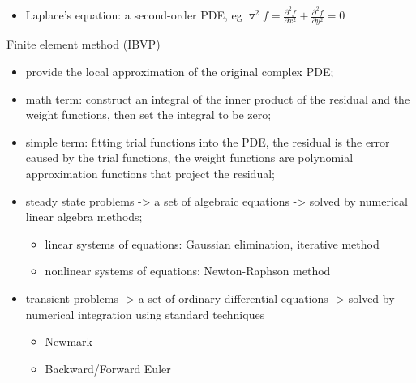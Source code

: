 \documentclass[12pt]{report}
\renewcommand{\_}{\kern-1.5pt\textunderscore\kern-1.5pt}
\begin{document}
\begin{itemize}
\begin{itemize}
	\item Laplace’s equation: a second-order PDE, eg  \( \triangledown ^{2}f=\frac{ \partial ^{2}f}{ \partial x^{2}}+\frac{ \partial ^{2}f}{ \partial y^{2}}=0 \) 
\end{itemize}\par

Finite element method (IBVP)\par

\begin{itemize}
	\item provide the local approximation of the original complex PDE;\par

	\item math term: construct an integral of the inner product of the residual and the weight functions, then set the integral to be zero;\par

	\item simple term: fitting trial functions into the PDE, the residual is the error caused by the trial functions, the weight functions are polynomial approximation functions that project the residual;\par

	\item steady state problems -> a set of algebraic equations -> solved by numerical linear algebra methods;\par

\begin{itemize}
	\item linear systems of equations: Gaussian elimination, iterative method\par

	\item nonlinear systems of equations: Newton-Raphson method\par


\end{itemize}
	\item transient problems -> a set of ordinary differential equations -> solved by numerical integration using standard techniques \par

\begin{itemize}
	\item Newmark\par

	\item Backward/Forward Euler \par


\end{itemize}
\end{itemize}
\end{itemize}
\end{document}

